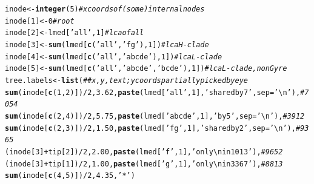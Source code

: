 \documentclass{article}\usepackage[]{graphicx}\usepackage[]{color}
\makeatletter
\newcommand{\hlnum}[1]{\textcolor[rgb]{0.686,0.059,0.569}{#1}}%
\newcommand{\hlstr}[1]{\textcolor[rgb]{0.192,0.494,0.8}{#1}}%
\newcommand{\hlcom}[1]{\textcolor[rgb]{0.678,0.584,0.686}{\textit{#1}}}%
\newcommand{\hlopt}[1]{\textcolor[rgb]{0,0,0}{#1}}%
\newcommand{\hlstd}[1]{\textcolor[rgb]{0.345,0.345,0.345}{#1}}%
\newcommand{\hlkwb}[1]{\textcolor[rgb]{0.69,0.353,0.396}{#1}}%
\newcommand{\hlkwc}[1]{\textcolor[rgb]{0.333,0.667,0.333}{#1}}%
\newcommand{\hlkwd}[1]{\textcolor[rgb]{0.737,0.353,0.396}{\textbf{#1}}}%
\newenvironment{kframe}{%
 \def\at@end@of@kframe{}%
 \ifinner\ifhmode%
  \def\at@end@of@kframe{\end{minipage}}%
  \begin{minipage}{\columnwidth}%
 \fi\fi%
 \def\FrameCommand##1{\hskip\@totalleftmargin \hskip-\fboxsep
 \colorbox{shadecolor}{##1}\hskip-\fboxsep
     \hskip-\linewidth \hskip-\@totalleftmargin \hskip\columnwidth}%
 \MakeFramed {\advance\hsize-\width
   \@totalleftmargin\z@ \linewidth\hsize
   \@setminipage}}%
 {\par\unskip\endMakeFramed%
 \at@end@of@kframe}
\newenvironment{knitrout}{}{} %
\makeatother
\begin{document}
\begin{knitrout}
\begin{kframe}
\begin{alltt}
  \hlstd{inode} \hlkwb{<-} \hlkwd{integer}\hlstd{(}\hlnum{5}\hlstd{)} \hlcom{# x coords of (some) internal nodes}
  \hlstd{inode[}\hlnum{1}\hlstd{]} \hlkwb{<-} \hlnum{0}                                    \hlcom{# root}
  \hlstd{inode[}\hlnum{2}\hlstd{]} \hlkwb{<-} \hlstd{lmed[}\hlstr{'all'}\hlstd{,}\hlnum{1}\hlstd{]}                        \hlcom{# lca of all}
  \hlstd{inode[}\hlnum{3}\hlstd{]} \hlkwb{<-} \hlkwd{sum}\hlstd{(lmed[}\hlkwd{c}\hlstd{(}\hlstr{'all'}\hlstd{,}\hlstr{'fg'}\hlstd{),}\hlnum{1}\hlstd{])}           \hlcom{# lca H-clade}
  \hlstd{inode[}\hlnum{4}\hlstd{]} \hlkwb{<-} \hlkwd{sum}\hlstd{(lmed[}\hlkwd{c}\hlstd{(}\hlstr{'all'}\hlstd{,}\hlstr{'abcde'}\hlstd{),}\hlnum{1}\hlstd{])}        \hlcom{# lca L-clade}
  \hlstd{inode[}\hlnum{5}\hlstd{]} \hlkwb{<-} \hlkwd{sum}\hlstd{(lmed[}\hlkwd{c}\hlstd{(}\hlstr{'all'}\hlstd{,}\hlstr{'abcde'}\hlstd{,}\hlstr{'bcde'}\hlstd{),}\hlnum{1}\hlstd{])} \hlcom{# lca L-clade, nonGyre}
  \hlstd{tree.labels} \hlkwb{<-} \hlkwd{list}\hlstd{(} \hlcom{## x,y,text; y coords partially picked by eye}
    \hlkwd{sum}\hlstd{(inode[}\hlkwd{c}\hlstd{(}\hlnum{1}\hlstd{,}\hlnum{2}\hlstd{)])}\hlopt{/}\hlnum{2}\hlstd{,} \hlnum{3.62}\hlstd{,} \hlkwd{paste}\hlstd{(lmed[}\hlstr{'all'}  \hlstd{,}\hlnum{1}\hlstd{],} \hlstr{'shared by 7'}\hlstd{,} \hlkwc{sep}\hlstd{=}\hlstr{'\textbackslash{}n'}\hlstd{),} \hlcom{# 7054}
    \hlkwd{sum}\hlstd{(inode[}\hlkwd{c}\hlstd{(}\hlnum{2}\hlstd{,}\hlnum{4}\hlstd{)])}\hlopt{/}\hlnum{2}\hlstd{,} \hlnum{5.75}\hlstd{,} \hlkwd{paste}\hlstd{(lmed[}\hlstr{'abcde'}\hlstd{,}\hlnum{1}\hlstd{],} \hlstr{'by 5'}       \hlstd{,} \hlkwc{sep}\hlstd{=}\hlstr{'\textbackslash{}n'}\hlstd{),} \hlcom{# 3912}
    \hlkwd{sum}\hlstd{(inode[}\hlkwd{c}\hlstd{(}\hlnum{2}\hlstd{,}\hlnum{3}\hlstd{)])}\hlopt{/}\hlnum{2}\hlstd{,} \hlnum{1.50}\hlstd{,} \hlkwd{paste}\hlstd{(lmed[}\hlstr{'fg'}   \hlstd{,}\hlnum{1}\hlstd{],} \hlstr{'shared by 2'}\hlstd{,} \hlkwc{sep}\hlstd{=}\hlstr{'\textbackslash{}n'}\hlstd{),} \hlcom{# 9365}
    \hlstd{(inode[}\hlnum{3}\hlstd{]}\hlopt{+}\hlstd{tip[}\hlnum{2}\hlstd{])}\hlopt{/}\hlnum{2}\hlstd{,}  \hlnum{2.00}\hlstd{,} \hlkwd{paste}\hlstd{(lmed[}\hlstr{'f'}    \hlstd{,}\hlnum{1}\hlstd{],} \hlstr{'only\textbackslash{}nin 1013'}\hlstd{),}         \hlcom{# 9652 }
    \hlstd{(inode[}\hlnum{3}\hlstd{]}\hlopt{+}\hlstd{tip[}\hlnum{1}\hlstd{])}\hlopt{/}\hlnum{2}\hlstd{,}  \hlnum{1.00}\hlstd{,} \hlkwd{paste}\hlstd{(lmed[}\hlstr{'g'}    \hlstd{,}\hlnum{1}\hlstd{],} \hlstr{'only\textbackslash{}nin 3367'}\hlstd{),}         \hlcom{# 8813 }
    \hlkwd{sum}\hlstd{(inode[}\hlkwd{c}\hlstd{(}\hlnum{4}\hlstd{,}\hlnum{5}\hlstd{)])}\hlopt{/}\hlnum{2}\hlstd{,} \hlnum{4.35}\hlstd{,} \hlstr{'* '}\hlstd{)}



\end{alltt}
\end{kframe}
\end{knitrout}
\end{document}
